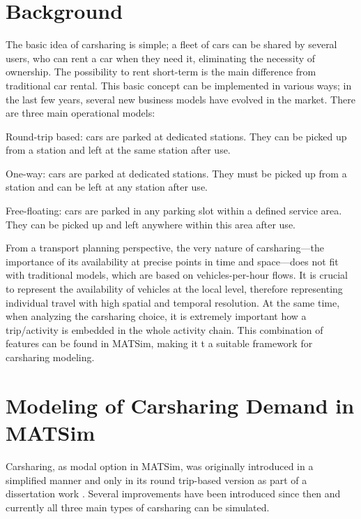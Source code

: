 \section{Background}
The basic idea of carsharing is simple; a fleet of cars can be shared by several users, who can rent a car when they need it, eliminating the necessity of ownership. The possibility to rent short-term is the main difference from traditional car rental. This basic concept can be implemented in various ways;  in the last few years, several new business models have evolved in the market. There are three main operational models:
%
\begin{compactitem}
	\item Round-trip based: cars are parked at dedicated stations. They can be picked up from a station and left at the same station after use.
	\item One-way: cars are parked at dedicated stations. They must be picked up from a station and can be left at any station after use.
	\item Free-floating: cars are parked in any parking slot within a defined service area. They can be picked up and left anywhere within this area after use. 
\end{compactitem}
%
From a transport planning perspective, the very nature of carsharing---the importance of its availability at precise points in time and space---does not fit with traditional models, which are based on vehicles-per-hour flows. It is crucial to represent the availability of vehicles at the local level,  therefore representing individual travel with high spatial and temporal resolution. At the same time, when analyzing the carsharing choice, it is extremely important how a trip/activity is embedded in the whole activity chain. This combination of features can be found in MATSim, making it t a suitable framework for carsharing modeling. 

\section{Modeling of Carsharing Demand in MATSim}
Carsharing, as modal option in MATSim, was originally introduced in a simplified manner and only in its round trip-based version as part of a dissertation work \citep[][]{Ciari_PhDThesis_2012}. Several improvements have been introduced since then and currently all three main types of carsharing can be simulated.

